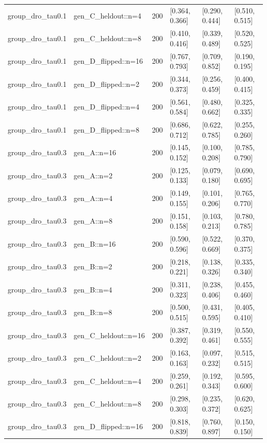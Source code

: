 \begin{tabular}{llrlll}
group\_dro\_tau0.1 & gen\_C\_heldout::n=4 & 200 & [0.364, 0.366] & [0.290, 0.444] & [0.510, 0.515] \\
group\_dro\_tau0.1 & gen\_C\_heldout::n=8 & 200 & [0.410, 0.416] & [0.339, 0.489] & [0.520, 0.525] \\
group\_dro\_tau0.1 & gen\_D\_flipped::n=16 & 200 & [0.767, 0.793] & [0.709, 0.852] & [0.190, 0.195] \\
group\_dro\_tau0.1 & gen\_D\_flipped::n=2 & 200 & [0.344, 0.373] & [0.256, 0.459] & [0.400, 0.415] \\
group\_dro\_tau0.1 & gen\_D\_flipped::n=4 & 200 & [0.561, 0.584] & [0.480, 0.662] & [0.325, 0.335] \\
group\_dro\_tau0.1 & gen\_D\_flipped::n=8 & 200 & [0.686, 0.712] & [0.622, 0.785] & [0.255, 0.260] \\
group\_dro\_tau0.3 & gen\_A::n=16 & 200 & [0.145, 0.152] & [0.100, 0.208] & [0.785, 0.790] \\
group\_dro\_tau0.3 & gen\_A::n=2 & 200 & [0.125, 0.133] & [0.079, 0.180] & [0.690, 0.695] \\
group\_dro\_tau0.3 & gen\_A::n=4 & 200 & [0.149, 0.155] & [0.101, 0.206] & [0.765, 0.770] \\
group\_dro\_tau0.3 & gen\_A::n=8 & 200 & [0.151, 0.158] & [0.103, 0.213] & [0.780, 0.785] \\
group\_dro\_tau0.3 & gen\_B::n=16 & 200 & [0.590, 0.596] & [0.522, 0.669] & [0.370, 0.375] \\
group\_dro\_tau0.3 & gen\_B::n=2 & 200 & [0.218, 0.221] & [0.138, 0.326] & [0.335, 0.340] \\
group\_dro\_tau0.3 & gen\_B::n=4 & 200 & [0.311, 0.323] & [0.238, 0.406] & [0.455, 0.460] \\
group\_dro\_tau0.3 & gen\_B::n=8 & 200 & [0.500, 0.515] & [0.431, 0.595] & [0.405, 0.410] \\
group\_dro\_tau0.3 & gen\_C\_heldout::n=16 & 200 & [0.387, 0.392] & [0.319, 0.461] & [0.550, 0.555] \\
group\_dro\_tau0.3 & gen\_C\_heldout::n=2 & 200 & [0.163, 0.163] & [0.097, 0.232] & [0.515, 0.515] \\
group\_dro\_tau0.3 & gen\_C\_heldout::n=4 & 200 & [0.259, 0.261] & [0.192, 0.343] & [0.595, 0.600] \\
group\_dro\_tau0.3 & gen\_C\_heldout::n=8 & 200 & [0.298, 0.303] & [0.235, 0.372] & [0.620, 0.625] \\
group\_dro\_tau0.3 & gen\_D\_flipped::n=16 & 200 & [0.818, 0.839] & [0.760, 0.897] & [0.150, 0.150] \\

\end{tabular}
